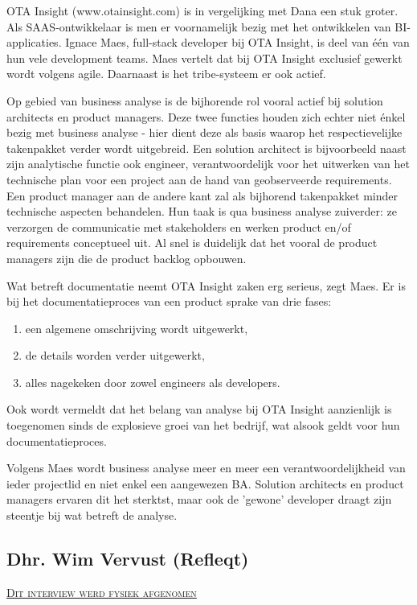 \documentclass{hogent-article}
\begin{document}
OTA Insight (www.otainsight.com) is in vergelijking met Dana een stuk groter. Als SAAS-ontwikkelaar is men er voornamelijk bezig met
het ontwikkelen van BI-applicaties. Ignace Maes, full-stack developer bij OTA Insight, is deel van één van hun vele development teams.
Maes vertelt dat bij OTA Insight exclusief gewerkt wordt volgens agile. Daarnaast is het tribe-systeem er ook actief.

Op gebied van business analyse is de bijhorende rol vooral actief bij solution architects en product managers. Deze twee functies
houden zich echter niet énkel bezig met business analyse - hier dient deze als basis waarop het respectievelijke takenpakket verder wordt uitgebreid.
Een solution architect is bijvoorbeeld naast zijn analytische functie ook engineer, verantwoordelijk voor het uitwerken van het technische
plan voor een project aan de hand van geobserveerde requirements. Een product manager aan de andere kant zal als bijhorend takenpakket
minder technische aspecten behandelen. Hun taak is qua business analyse zuiverder: ze verzorgen de communicatie met stakeholders en werken
product en/of requirements conceptueel uit. Al snel is duidelijk dat het vooral de product managers zijn die de product backlog 
opbouwen.

Wat betreft documentatie neemt OTA Insight zaken erg serieus, zegt Maes. Er is bij het documentatieproces van een product sprake van drie fases:

\begin{enumerate}
  \item een algemene omschrijving wordt uitgewerkt,
  \item de details worden verder uitgewerkt,
  \item alles nagekeken door zowel engineers als developers.
\end{enumerate}
Ook wordt vermeldt dat het belang van analyse bij OTA Insight aanzienlijk is toegenomen sinds de explosieve groei van het bedrijf, wat
alsook geldt voor hun documentatieproces. 

Volgens Maes wordt business analyse meer en meer een verantwoordelijkheid
van ieder projectlid en niet enkel een aangewezen BA. Solution architects en product managers ervaren dit het sterktst, maar ook de 'gewone'
developer draagt zijn steentje bij wat betreft de analyse.

\subsection{Dhr. Wim Vervust (Refleqt)}
\textsc{\underline{Dit interview werd fysiek afgenomen}}
\end{document}
